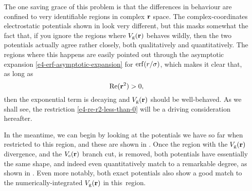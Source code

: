 The one saving grace of this problem is that the differences in behaviour are confined to very identifiable regions in complex $\vb{r}$ space. The complex-coordinates electrostatic potentials shown in  look very different, but this masks somewhat the fact that, if you ignore the regions where $V_\mathrm{g}(\vb{r})$ behaves wildly, then the two potentials actually agree rather closely, both qualitatively and quantitatively. The regions where this happens are easily pointed out through the asymptotic expansion \eqref{e4-erf-asymptotic-expansion} for $\erf(r/\sigma)$, which makes it clear that, as long as
%
\begin{equation}
\Re(\vb{r}^2)>0,
\label{e4-re-r2-less-than-0}
\end{equation}
%
then the exponential term is decaying and $V_\mathrm{g}(\vb{r})$ should be well-behaved. As we shall see, the restriction \eqref{e4-re-r2-less-than-0} will be a driving consideration hereafter.

In the meantime, we can begin by looking at the potentials we have so far when restricted to this region, and these are shown in . Once the region with the $V_\mathrm{g}(\vb{r})$ divergence, and the $V_\mathrm{e}(\vb{r})$ branch cut, is removed, both potentials have essentially the same shape, and indeed even quantitatively match to a remarkable degree, as shown in . Even more notably, both exact potentials also show a good match to the numerically-integrated $V_\mathrm{g}(\vb{r})$ in this~region.



